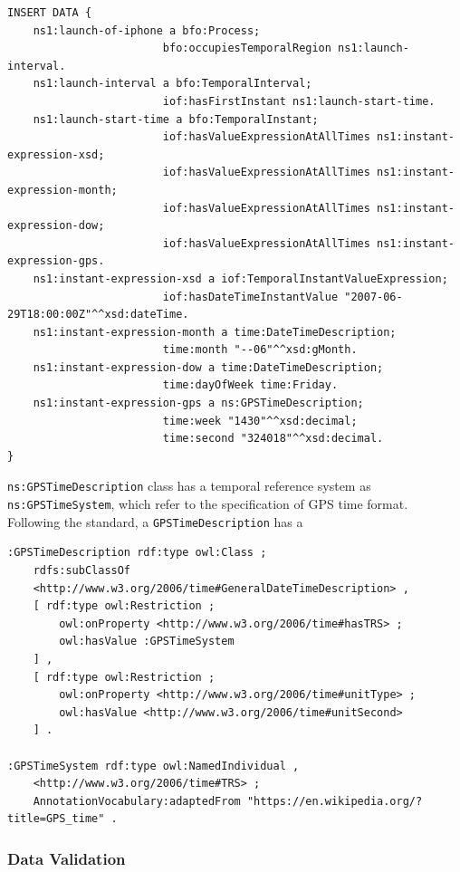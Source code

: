 \begin{verbatim}
INSERT DATA {
    ns1:launch-of-iphone a bfo:Process;
                        bfo:occupiesTemporalRegion ns1:launch-interval.
    ns1:launch-interval a bfo:TemporalInterval;
                        iof:hasFirstInstant ns1:launch-start-time.
    ns1:launch-start-time a bfo:TemporalInstant;
                        iof:hasValueExpressionAtAllTimes ns1:instant-expression-xsd;
                        iof:hasValueExpressionAtAllTimes ns1:instant-expression-month;
                        iof:hasValueExpressionAtAllTimes ns1:instant-expression-dow;
                        iof:hasValueExpressionAtAllTimes ns1:instant-expression-gps.
    ns1:instant-expression-xsd a iof:TemporalInstantValueExpression;
                        iof:hasDateTimeInstantValue "2007-06-29T18:00:00Z"^^xsd:dateTime.
    ns1:instant-expression-month a time:DateTimeDescription;
                        time:month "--06"^^xsd:gMonth.
    ns1:instant-expression-dow a time:DateTimeDescription;
                        time:dayOfWeek time:Friday.
    ns1:instant-expression-gps a ns:GPSTimeDescription;
                        time:week "1430"^^xsd:decimal;
                        time:second "324018"^^xsd:decimal. 
}
\end{verbatim}

\texttt{ns:GPSTimeDescription} class has a temporal reference system as \texttt{ns:GPSTimeSystem}, which refer to the specification of GPS time format. Following the standard, a \texttt{GPSTimeDescription} has a 

\begin{verbatim}
:GPSTimeDescription rdf:type owl:Class ;
    rdfs:subClassOf 
    <http://www.w3.org/2006/time#GeneralDateTimeDescription> ,
    [ rdf:type owl:Restriction ;
        owl:onProperty <http://www.w3.org/2006/time#hasTRS> ;
        owl:hasValue :GPSTimeSystem
    ] ,
    [ rdf:type owl:Restriction ;
        owl:onProperty <http://www.w3.org/2006/time#unitType> ;
        owl:hasValue <http://www.w3.org/2006/time#unitSecond>
    ] .    

:GPSTimeSystem rdf:type owl:NamedIndividual ,
    <http://www.w3.org/2006/time#TRS> ;
    AnnotationVocabulary:adaptedFrom "https://en.wikipedia.org/?title=GPS_time" .
\end{verbatim}


\subsubsection*{Data Validation}

